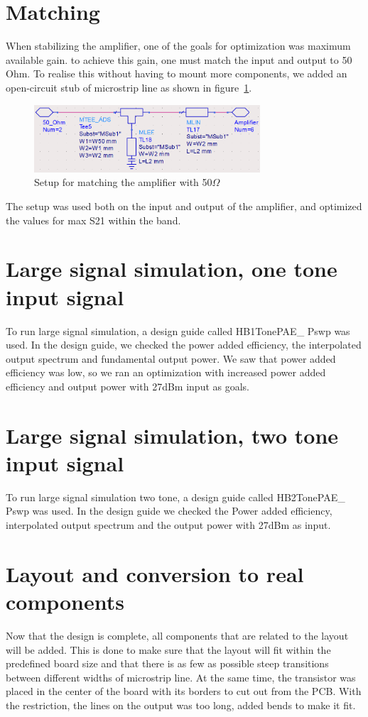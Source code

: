  \section{Matching}
  When stabilizing the amplifier, one of the goals for optimization was maximum available gain. to achieve this gain, one must match the input and output to 50 Ohm. To realise this without having to mount more components, we added an open-circuit stub of microstrip line as shown in figure~\ref{fig:fig_match_net}.
  \begin{figure}[h]
	\centering
	\includegraphics[width=0.75\textwidth]{img/Matching_network}
	\caption{Setup for matching the amplifier with 50$\Omega$}
	\label{fig:fig_match_net}
  \end{figure}
  The setup was used both on the input and output of the amplifier, and optimized the values for max S21 within the band.
  
  \section{Large signal simulation, one tone input signal}
  To run large signal simulation, a design guide called HB1TonePAE\_ Pswp was used. In the design guide, we checked the power added efficiency, the interpolated output spectrum and fundamental output power. We saw that power added efficiency was low, so we ran an optimization with increased power added efficiency and output power with 27dBm input as goals.
  
  \section{Large signal simulation, two tone input signal}
  To run large signal simulation two tone, a design guide called HB2TonePAE\_ Pswp was used. In the design guide we checked the Power added efficiency, interpolated output spectrum and the output power with 27dBm as input. 
  \section{Layout and conversion to real components}
  Now that the design is complete, all components that are related to the layout will be added. This is done to make sure that the layout will fit within the predefined board size and that there is as few as possible steep transitions between different widths of microstrip line. At the same time, the transistor was placed in the center of the board with its borders to cut out from the PCB. With the restriction, the lines on the output was too long, added bends to make it fit.
